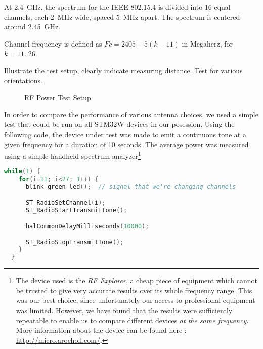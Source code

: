 At \SI{2.4}{GHz}, the spectrum for the IEEE 802.15.4 is divided into 16 equal
channels, each \SI{2}{MHz} wide, spaced \SI{5}{MHz} apart. The spectrum is
centered around \SI{2.45}{GHz}.\citep[pg. 29]{ieee802154}

Channel frequency is defined as $Fc = 2405 + 5 (k-11)$ in Megaherz, for $k
= 11..26$.

Illustrate the test setup, clearly indicate measuring distance. Test for various
orientations.

\begin{figure}[htb]
  \begin{center}
  \end{center}
  \caption{RF Power Test Setup}
  \label{fig:power-test-setup}
\end{figure}

In order to compare the performance of various antenna choices, we used a simple
test that could be run on all STM32W devices in our posession. Using the
following code, the device under test was made to emit a continuous tone at
a given frequency for a duration of 10 seconds. The average power was measured
using a simple handheld spectrum analyzer\footnote{The device used is the
\emph{RF Explorer}, a cheap piece of equipment which cannot be trusted to give
very accurate results over its whole frequency range. This was our best choice,
since unfortunately our access to professional equipment was limited. However,
we have found that the results were sufficiently repeatable to enable us to
compare different devices \emph{at the same frequency}. More information about
the device can be found here : \url{http://micro.arocholl.com/}.}

\begin{lstlisting}[language=C,caption=Tone generation code]
  while(1) {
    for(i=11; i<27; 1++) {
      blink_green_led();  // signal that we're changing channels

      ST_RadioSetChannel(i);
      ST_RadioStartTransmitTone();

      halCommonDelayMilliseconds(10000);

      ST_RadioStopTransmitTone();
    }
  }
\end{lstlisting}

